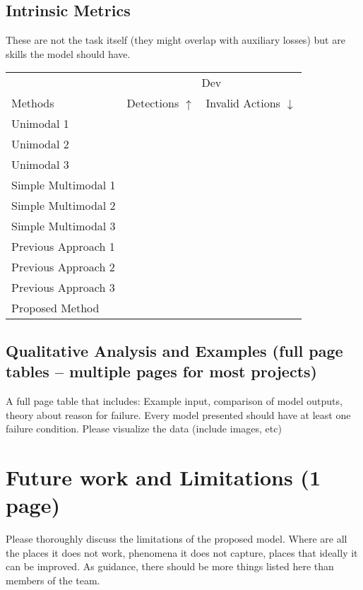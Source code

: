 \documentclass[11pt,a4paper]{article}
\begin{document}
\subsection{Intrinsic Metrics}
These are not the task itself (they might overlap with auxiliary losses) but are skills the model should have.
\begin{table}[t]
\centering
\begin{tabular}{@{}lrr@{}}
\toprule
                            & \multicolumn{2}{c}{Dev} \\
Methods                     & Detections $\uparrow$ & Invalid Actions $\downarrow$  \\
\midrule
Unimodal 1 \cite{} & & \\
Unimodal 2 \cite{} & & \\
Unimodal 3 \cite{} & & \\
\midrule
Simple Multimodal 1 \cite{} & &  \\
Simple Multimodal 2 \cite{} & &  \\
Simple Multimodal 3 \cite{} & &  \\
\midrule
Previous Approach 1 \cite{} & &  \\
Previous Approach 2 \cite{} & &  \\
Previous Approach 3 \cite{} & &  \\
\midrule
Proposed Method             & &  \\
\bottomrule
\end{tabular}
\end{table}

\clearpage
\subsection{Qualitative Analysis and Examples (full page tables -- multiple pages for most projects)}
A full page table that includes: Example input, comparison of model outputs, theory about reason for failure. Every model presented should have at least one failure condition.  Please visualize the data (include images, etc)

\clearpage
\section{Future work and Limitations (1 page)}
Please thoroughly discuss the limitations of the proposed model.  Where are all the places it does not work, phenomena it does not capture, places that ideally it can be improved. As guidance, there should be more things listed here than members of the team.
\end{document}
